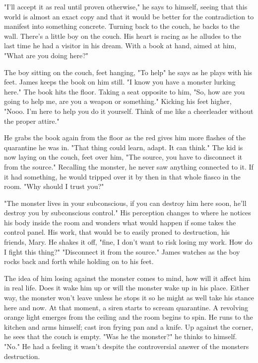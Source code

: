         "I'll accept it as real until proven otherwise," he says to himself, seeing that this world is almost an exact copy and that it would
    be better for the contradiction to manifest into something concrete. Turning back to the couch, he backs to the wall. There's a little
    boy on the couch. His heart is racing as he alludes to the last time he had a visitor in his dream. With a book at hand, aimed at him, "What
    are you doing here?"

        The boy sitting on the couch, feet hanging, "To help" he says as he plays with his feet. James keeps the book on him still. "I know
    you have a monster lurking here." The book hits the floor. Taking a seat opposite to him, "So, how are you going to help me, are you a
    weapon or something." Kicking his feet higher, "Nooo. I'm here to help you do it yourself. Think of me like a cheerleader without the
    proper attire." 

        He grabs the book again from the floor as the red gives him more flashes of the quarantine he was in. "That thing could learn, adapt.
    It can think." The kid is now laying on the couch, feet over him, "The source, you have to disconnect it from the source." Recalling
    the monster, he never saw anything connected to it. If it had something, he would tripped over it by then in that whole fiasco in the
    room. "Why should I trust you?"

        "The monster lives in your subconscious, if you can destroy him here soon, he'll destroy you by subconscious control." His perception
    changes to where he notices his body inside the room and wonders what would happen if some takes the control panel. His work, that would
    be to easily proned to destruction, his friends, Mary. He shakes it off, "fine, I don't want to risk losing my work. How do I fight this
    thing?" "Disconnect it from the source." James watches as the boy rocks back and forth while holding on to his feet.

        The idea of him losing against the monster comes to mind, how will it affect him in real life. Does it wake him up or will the monster
    wake up in his place. Either way, the monster won't leave unless he stops it so he might as well take his stance here and now. At that
    moment, a siren starts to scream quarantine. A revolving orange light emerges from the ceiling and the room begins to spin. He runs to
    the kitchen and arms himself; cast iron frying pan and a knife. Up against the corner, he sees that the couch is empty. "Was he the monster?"
    he thinks to himself. "No." He had a feeling it wasn't despite the controversial answer of the monsters destruction.

